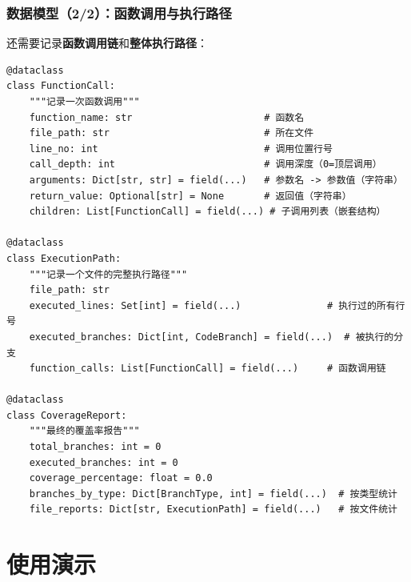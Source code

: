 \documentclass[presentation,aspectratio=169,fontset=none]{ctexbeamer}
\begin{document}
\begin{frame}[fragile]
\frametitle{数据模型（2/2）：函数调用与执行路径}
{\footnotesize 还需要记录\textbf{函数调用链}和\textbf{整体执行路径}：}

\vspace{0.05cm}
{\tiny
\begin{verbatim}
@dataclass
class FunctionCall:
    """记录一次函数调用"""
    function_name: str                       # 函数名
    file_path: str                           # 所在文件
    line_no: int                             # 调用位置行号
    call_depth: int                          # 调用深度（0=顶层调用）
    arguments: Dict[str, str] = field(...)   # 参数名 -> 参数值（字符串）
    return_value: Optional[str] = None       # 返回值（字符串）
    children: List[FunctionCall] = field(...) # 子调用列表（嵌套结构）

@dataclass
class ExecutionPath:
    """记录一个文件的完整执行路径"""
    file_path: str
    executed_lines: Set[int] = field(...)               # 执行过的所有行号
    executed_branches: Dict[int, CodeBranch] = field(...)  # 被执行的分支
    function_calls: List[FunctionCall] = field(...)     # 函数调用链

@dataclass
class CoverageReport:
    """最终的覆盖率报告"""
    total_branches: int = 0
    executed_branches: int = 0
    coverage_percentage: float = 0.0
    branches_by_type: Dict[BranchType, int] = field(...)  # 按类型统计
    file_reports: Dict[str, ExecutionPath] = field(...)   # 按文件统计
\end{verbatim}}
\end{frame}


\section{使用演示}
\end{document}
